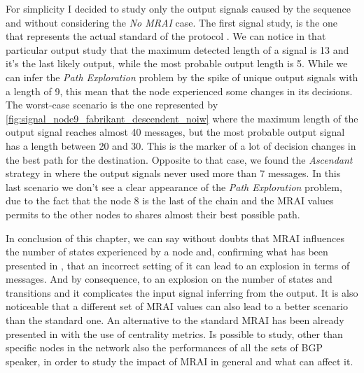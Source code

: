 For simplicity I decided to study only the output signals caused by the sequence
 and without considering the \textit{No MRAI} case.
The first signal study,  is the
one that represents the actual standard of the protocol \cite{rfc4271}.
We can notice in that particular output study that the maximum detected length of
a signal is \num{13} and it's the last likely output, while the most probable
output length is \num{5}.
While we can infer the \textit{Path Exploration} problem by the spike of unique
output signals with a length of \num{9}, this mean that the node experienced some
changes in its decisions.
The worst-case scenario is the one represented by \cref{fig:signal_node9_fabrikant_descendent_noiw}
where the maximum length of the output signal reaches almost \num{40} messages, but
the most probable output signal has a length between \num{20} and \num{30}.
This is the marker of a lot of decision changes in the best path for the destination.
Opposite to that case, we found the \textit{Ascendant} strategy in
 where the output
signals never used more than \num{7} messages.
In this last scenario we don't see a clear appearance of the \textit{Path Exploration}
problem, due to the fact that the node \num{8} is the last of the chain and
the \ac{MRAI} values permits to the other nodes to shares almost their best
possible path.

In conclusion of this chapter, we can say without doubts that \ac{MRAI} influences
the number of states experienced by a node and, confirming what has been presented in
\cite{fabrikant2011there}, that an incorrect setting of it can lead to an explosion
in terms of messages.
And by consequence, to an explosion on the number of states and transitions
and it complicates the input signal inferring from the output.
It is also noticeable that a different set of \ac{MRAI} values can also lead
to a better scenario than the standard one.
An alternative to the standard \ac{MRAI} has been already presented in
\cite{milani2020improving} with the use of centrality metrics.
Is possible to study, other than specific nodes in the network also the performances
of all the sets of \ac{BGP} speaker, in order to study the impact of \ac{MRAI}
in general and what can affect it.
